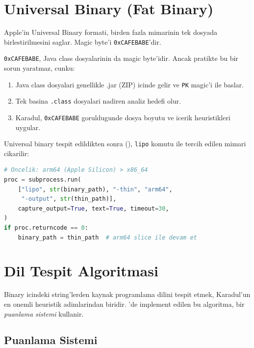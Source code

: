 \section{Universal Binary (Fat Binary)}
\label{sec:universal-binary}

Apple'in Universal Binary formati, birden fazla mimarinin tek dosyada birlestirilmesini saglar. Magic byte'i \texttt{0xCAFEBABE}'dir.

\begin{uyari}
\texttt{0xCAFEBABE}, Java class dosyalarinin da magic byte'idir. Ancak pratikte bu bir sorun yaratmaz, cunku:
\begin{enumerate}
\item Java class dosyalari genellikle .jar (ZIP) icinde gelir ve \texttt{PK} magic'i ile baslar.
\item Tek basina \texttt{.class} dosyalari nadiren analiz hedefi olur.
\item Karadul, \texttt{0xCAFEBABE} goruldugunde dosya boyutu ve icerik heuristikleri uygular.
\end{enumerate}
\end{uyari}

Universal binary tespit edildikten sonra (), \texttt{lipo} komutu ile tercih edilen mimari cikarilir:

\begin{lstlisting}[language=Python, caption={lipo thin ile mimari cikartma}]
# Oncelik: arm64 (Apple Silicon) > x86_64
proc = subprocess.run(
    ["lipo", str(binary_path), "-thin", "arm64",
     "-output", str(thin_path)],
    capture_output=True, text=True, timeout=30,
)
if proc.returncode == 0:
    binary_path = thin_path  # arm64 slice ile devam et
\end{lstlisting}


\section{Dil Tespit Algoritmasi}
\label{sec:language-detection}

Binary icindeki string'lerden kaynak programlama dilini tespit etmek, Karadul'un en onemli heuristik adimlarindan biridir. 'de implement edilen bu algoritma, bir \emph{puanlama sistemi} kullanir.

\subsection{Puanlama Sistemi}

